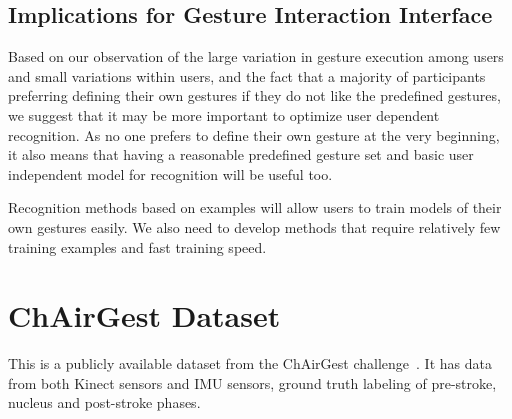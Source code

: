 \subsection{Implications for Gesture Interaction Interface}
Based on our observation of the large variation in gesture execution among
users and small variations within users, and the fact that a majority of
participants preferring defining their own gestures if they do not like the
predefined gestures, we suggest that it may be more important to optimize user
dependent recognition. As no one prefers to define their own gesture at the very
beginning, it also means that having a reasonable predefined gesture set and
basic user independent model for recognition will be useful too.

Recognition methods based on examples will allow users to train models of their
own gestures easily. We also need to develop methods that
require relatively few training examples and fast training speed.

\section{ChAirGest Dataset}
This is a publicly available dataset from the ChAirGest
challenge~\cite{Ruffieux2013}. It has data from both Kinect sensors and IMU
sensors, ground truth labeling of pre-stroke, nucleus and post-stroke phases. 
